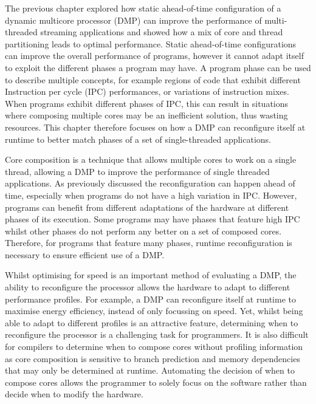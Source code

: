The previous chapter explored how static ahead-of-time configuration of a dynamic multicore processor (DMP) can improve the performance of multi-threaded streaming applications and showed how a mix of core and thread partitioning leads to optimal performance.
Static ahead-of-time configurations can improve the overall performance of programs, however it cannot adapt itself to exploit the different phases a program may have.
A program phase can be used to describe multiple concepts, for example regions of code that exhibit different Instruction per cycle (IPC) performances, or variations of instruction mixes.
When programs exhibit different phases of IPC, this can result in situations where composing multiple cores may be an inefficient solution, thus wasting resources.
This chapter therefore focuses on how a DMP can reconfigure itself at runtime to better match phases of a set of single-threaded applications.

Core composition is a technique that allows multiple cores to work on a single thread, allowing a DMP to improve the performance of single threaded applications.
As previously discussed the reconfiguration can happen ahead of time, especially when programs do not have a high variation in IPC.
However, programs can benefit from different adaptations of the hardware at different phases of its execution.
Some programs may have phases that feature high IPC whilst other phases do not perform any better on a set of composed cores.
Therefore, for programs that feature many phases, runtime reconfiguration is necessary to ensure efficient use of a DMP.

Whilst optimising for speed is an important method of evaluating a DMP, the ability to reconfigure the processor allows the hardware to adapt to different performance profiles.
For example, a DMP can reconfigure itself at runtime to maximise energy efficiency, instead of only focussing on speed.
Yet, whilst being able to adapt to different profiles is an attractive feature, determining when to reconfigure the processor is a challenging task for programmers.
It is also difficult for compilers to determine when to compose cores without profiling information as core composition is sensitive to branch prediction and memory dependencies that may only be determined at runtime.%
Automating the decision of when to compose cores allows the programmer to solely focus on the software rather than decide when to modify the hardware.


